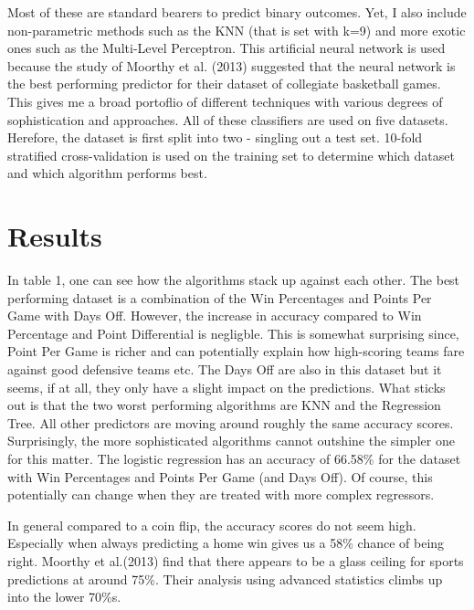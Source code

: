 \documentclass[11pt,a4paper,leqno]{article}
\begin{document}
Most of these are standard bearers to predict binary outcomes. Yet, I also include non-parametric methods such as the KNN (that is set with k=9) and more exotic ones such as the Multi-Level Perceptron. This artificial neural network is used because the study of Moorthy et al. (2013) suggested that the neural network is the best performing predictor for their dataset of collegiate basketball games. This gives me a broad portoflio of different techniques with various degrees of sophistication and approaches. All of these classifiers are used on five datasets. Herefore, the dataset is first split into two - singling out a test set. 10-fold stratified cross-validation is used on the training set to determine which dataset and which algorithm performs best.

\section{Results}





In table 1, one can see how the algorithms stack up against each other. The best performing dataset is a combination of the Win Percentages and Points Per Game with Days Off. However, the increase in accuracy compared to Win Percentage and Point Differential is negligble. This is somewhat surprising since, Point Per Game is richer and can potentially explain how high-scoring teams fare against good defensive teams etc. The Days Off are also in this dataset but it seems, if at all, they only have a slight impact on the predictions. What sticks out is that the two worst performing algorithms are KNN and the Regression Tree. All other predictors are moving around roughly the same accuracy scores. Surprisingly, the more sophisticated algorithms cannot outshine the simpler one for this matter. The logistic regression has an accuracy of 66.58\% for the dataset with Win Percentages and Points Per Game (and Days Off). Of course, this potentially can change when they are treated with more complex regressors.

In general compared to a coin flip, the accuracy scores do not seem high. Especially when always predicting a home win gives us a 58\% chance of being right. Moorthy et al.(2013) find that there appears to be a glass ceiling for sports predictions at around 75\%. Their analysis using advanced statistics climbs up into the lower 70\%s.
\end{document}
